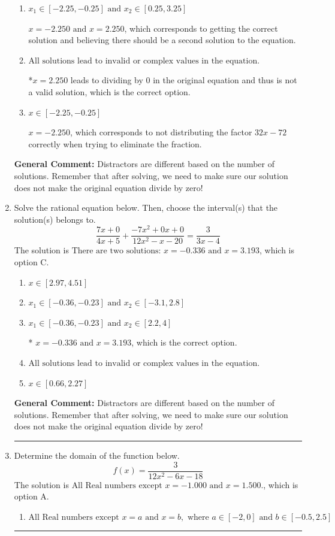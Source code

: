\documentclass{extbook}[14pt]
\newcommand{\litem}[1]{\item #1

\rule{\textwidth}{0.4pt}}
\begin{document}
\begin{enumerate}
{\begin{enumerate}[label=\Alph*.]
$x = 2.250$, which corresponds to not checking if this value leads to dividing by 0 in the original equation and thus is not a valid solution.
\item \( x_1 \in [-2.25, -0.25] \text{ and } x_2 \in [0.25,3.25] \)

$x = -2.250 \text{ and } x = 2.250$, which corresponds to getting the correct solution and believing there should be a second solution to the equation.
\item \( \text{All solutions lead to invalid or complex values in the equation.} \)

*$x = 2.250$ leads to dividing by 0 in the original equation and thus is not a valid solution, which is the correct option.
\item \( x \in [-2.25,-0.25] \)

$x = -2.250$, which corresponds to not distributing the factor $32x -72$ correctly when trying to eliminate the fraction.
\end{enumerate}

\textbf{General Comment:} Distractors are different based on the number of solutions. Remember that after solving, we need to make sure our solution does not make the original equation divide by zero!
}
\litem{
Solve the rational equation below. Then, choose the interval(s) that the solution(s) belongs to.
\[ \frac{7x + 0}{4x + 5} + \frac{-7x^{2} +0 x + 0}{12x^{2} -x -20} = \frac{3}{3x -4} \]The solution is \( \text{There are two solutions: } x = -0.336 \text{ and } x = 3.193 \), which is option C.\begin{enumerate}[label=\Alph*.]
\item \( x \in [2.97,4.51] \)


\item \( x_1 \in [-0.36, -0.23] \text{ and } x_2 \in [-3.1,2.8] \)


\item \( x_1 \in [-0.36, -0.23] \text{ and } x_2 \in [2.2,4] \)

* $x = -0.336 \text{ and } x = 3.193$, which is the correct option.
\item \( \text{All solutions lead to invalid or complex values in the equation.} \)


\item \( x \in [0.66,2.27] \)


\end{enumerate}

\textbf{General Comment:} Distractors are different based on the number of solutions. Remember that after solving, we need to make sure our solution does not make the original equation divide by zero!
}
\litem{
Determine the domain of the function below.
\[ f(x) = \frac{3}{12x^{2} -6 x -18} \]The solution is \( \text{All Real numbers except } x = -1.000 \text{ and } x = 1.500. \), which is option A.\begin{enumerate}[label=\Alph*.]
\item \( \text{All Real numbers except } x = a \text{ and } x = b, \text{ where } a \in [-2, 0] \text{ and } b \in [-0.5, 2.5] \)


\end{enumerate}}
\end{enumerate}
\end{document}
